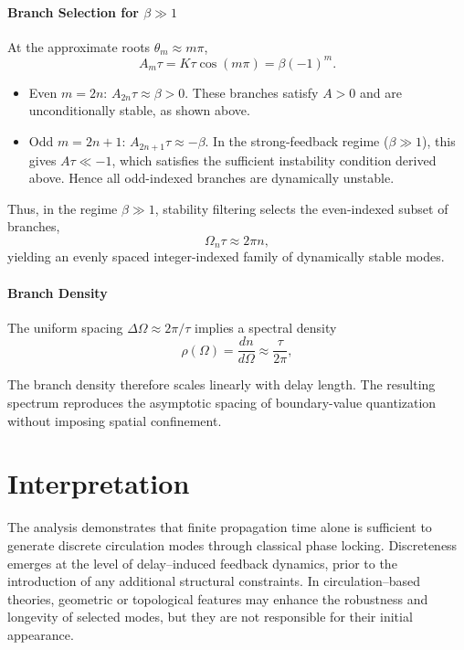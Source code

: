 \documentclass[pdflatex,sn-mathphys-num]{sn-jnl}
\begin{document}
        \paragraph{Branch Selection for \texorpdfstring{$\beta\gg1$}{beta>>1}}

            At the approximate roots $\theta_m\approx m\pi$,
            \begin{equation}
                A_m\tau = K\tau\cos(m\pi) = \beta(-1)^m.
            \end{equation}

            \begin{itemize}
                \item Even $m=2n$: $A_{2n}\tau\approx\beta>0$.
                These branches satisfy $A>0$ and are unconditionally stable, as shown above.

                \item Odd $m=2n+1$: $A_{2n+1}\tau\approx-\beta$.
                In the strong-feedback regime ($\beta\gg1$), this gives $A\tau\ll-1$, which satisfies the sufficient instability condition derived above.
                Hence all odd-indexed branches are dynamically unstable.
            \end{itemize}

            Thus, in the regime $\beta\gg1$, stability filtering selects the even-indexed subset of branches,
            \begin{equation}
                \Omega_n\tau\approx2\pi n,
            \end{equation}
            yielding an evenly spaced integer-indexed family of dynamically stable modes.

    \paragraph{Branch Density}

        The uniform spacing $\Delta\Omega\approx2\pi/\tau$ implies a spectral density
        \begin{equation}
            \rho(\Omega)=\frac{dn}{d\Omega}\approx\frac{\tau}{2\pi},
            \end{equation}

        The branch density therefore scales linearly with delay length.
        The resulting spectrum reproduces the asymptotic spacing of boundary-value quantization without imposing spatial confinement.
    \section{Interpretation}
    The analysis demonstrates that finite propagation time alone is sufficient to generate discrete circulation modes through classical phase locking. Discreteness emerges at the level of delay--induced feedback dynamics, prior to the introduction of any additional structural constraints. In circulation--based theories, geometric or topological features may enhance the robustness and longevity of selected modes, but they are not responsible for their initial appearance.
\end{document}
